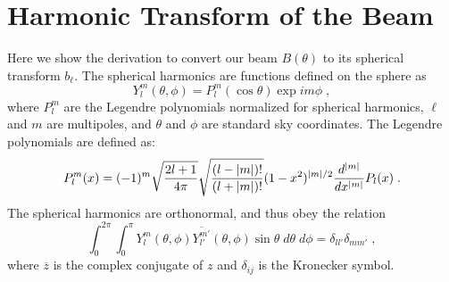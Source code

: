 \chapter{Harmonic Transform of the Beam} %
\label{app:trans} 

Here we show the derivation to convert our beam $B(\theta)$ to its spherical transform $b_\ell$. The spherical harmonics are functions defined on the sphere as
\begin{equation}
    Y_l^m(\theta,\phi) = P_l^m(\cos\theta)\exp{i m\phi} \; ,
\end{equation}
where $P_l^m$ are the Legendre polynomials normalized for spherical harmonics, $\ell$ and $m$ are multipoles, and $\theta$ and $\phi$ are standard sky coordinates. The Legendre polynomials are defined as:
\begin{equation}
    P_l^m(x) = (-1)^m\sqrt{\frac{2l+1}{4\pi}}\sqrt{\frac{(l-\abs{m})!}{(l+\abs{m})!}}(1-x^2)^{\abs{m}/2}\frac{d^{\abs{m}}}{dx^{\abs{m}}}P_l(x) \; .
\end{equation}
The spherical harmonics are orthonormal, and thus obey the relation
\begin{equation}
    \int_0^{2\pi}\int_0^{\pi} Y_l^m(\theta,\phi)\overline{Y_{l'}^{m'}}(\theta,\phi) \sin\theta \; d\theta\; d\phi = \delta_{ll'}\delta_{mm'} \; ,
\end{equation}
where $\overline{z}$ is the complex conjugate of $z$ and $\delta_{ij}$ is the Kronecker symbol.

